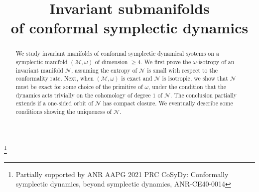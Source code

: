 \documentclass[JEP,XML,SOM,Unicode,published]{cedram}
\theoremstyle{definition}
\begin{document}
\frontmatter
\title[Conformal symplectic dynamics]{Invariant submanifolds\\
of conformal symplectic dynamics}

\author[\initial{M.-C.} \lastname{Arnaud}]{ }
\address{Université Paris Cité and Sorbonne Université, CNRS, IMJ-PRG,\\ F-75006 Paris, France\\
\& Institut universitaire de France}
\urladdr{}

\author[\initial{J.} \lastname{Fejoz}]{ }
\address{Université Paris Dauphine, CEREMADE,\\
Place du Maréchal de Lattre de Tassigny,
75016 Paris, France\\
\& Observatoire de Paris, IMCCE,\\
77, avenue Denfert Rochereau,
75014 Paris, France}

\thanks{Partially supported by ANR AAPG 2021 PRC CoSyDy: Conformally symplectic dynamics, beyond symplectic dynamics, ANR-CE40-0014}

\begin{abstract}
We study invariant manifolds of conformal symplectic dynamical systems on a symplectic manifold $(\mathcal{M},\omega)$ of dimension $\geq 4$. We first prove the $\omega$-isotropy of an invariant manifold $\mathcal{N}$, assuming the entropy of $\mathcal{N}$ is small with respect to the conformality rate. Next, when $(\mathcal{M},\omega)$ is exact and $\mathcal{N}$ is isotropic, we show that $\mathcal{N}$ must be exact for some choice of the primitive of $\omega$, under the condition that the dynamics acts trivially on the cohomology of degree $1$ of $\mathcal{N}$. The conclusion partially extends if a one-sided orbit of $\mathcal{N}$ has compact closure. We eventually describe some conditions showing the uniqueness of $\mathcal{N}$.
\end{abstract}




\end{document}
